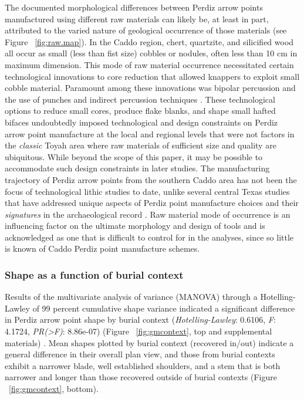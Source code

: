 \documentclass[review]{elsarticle}
\begin{document}
\newpage
The documented morphological differences between Perdiz arrow points manufactured using different raw materials can likely be, at least in part, attributed to the varied nature of geological occurrence of those materials (see Figure ~\ref{fig:raw.map}). In the Caddo region, chert, quartzite, and silicified wood all occur as small (less than fist size) cobbles or nodules, often less than 10 cm in maximum dimension. This mode of raw material occurrence necessitated certain technological innovations to core reduction that allowed knappers to exploit small cobble material. Paramount among these innovations was bipolar percussion and the use of punches and indirect percussion techniques \citep{RN8995,RN8996,RN8997,RN8998,RN2145}. These technological options to reduce small cores, produce flake blanks, and shape small hafted bifaces undoubtedly imposed technological and design constraints on Perdiz arrow point manufacture at the local and regional levels that were not factors in the \textit{classic} Toyah area where raw materials of sufficient size and quality are ubiquitous. While beyond the scope of this paper, it may be possible to accommodate such design constraints in later studies. The manufacturing trajectory of Perdiz arrow points from the southern Caddo area has not been the focus of technological lithic studies to date, unlike several central Texas studies that have addressed unique aspects of Perdiz point manufacture choices and their \textit{signatures} in the archaeological record \citep{RN8999,RN9000}. Raw material mode of occurrence is an influencing factor on the ultimate morphology and design of tools and is acknowledged as one that is difficult to control for in the analyses, since so little is known of Caddo Perdiz point manufacture schemes.

\subsubsection*{Shape as a function of burial context}

Results of the multivariate analysis of variance (MANOVA) through a Hotelling-Lawley of 99 percent cumulative shape variance indicated a significant difference in Perdiz arrow point shape by burial context (\textit{Hotelling-Lawley}: 0.6106, \textit{F}: 4.1724, \textit{PR(>F)}: 8.86e-07) (Figure ~\ref{fig:gmcontext}, top and supplemental materials) \citep[Chapter 4]{RN8980}. Mean shapes plotted by burial context (recovered in/out) indicate a general difference in their overall plan view, and those from burial contexts exhibit a narrower blade, well established shoulders, and a stem that is both narrower and longer than those recovered outside of burial contexts (Figure ~\ref{fig:gmcontext}, bottom).
\end{document}

